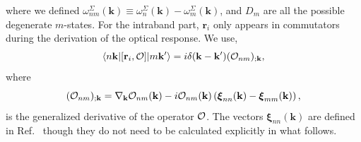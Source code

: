 \documentclass[floatfix,prb,aps,superscriptaddress,showpacs,11pt,preprint,letterpaper]{revtex4}
\begin{document}
where we defined
$\omega^\Sigma_{nm}(\mathbf{k})\equiv\omega^\Sigma_n(\mathbf{k})-\omega^\Sigma_m(\mathbf{k})$, and
$D_m$ are all the possible degenerate $m$-states. 
For the intraband part, $\mathbf{r}_i$ only appears in
commutators during the derivation of
the optical response. We use,\cite{aversaPRB95}
\begin{equation}
\langle n\mathbf{k} | [\mathbf{r}_i,{\cal O}] | m\mathbf{k}'\rangle
=i\delta(\mathbf{k}-\mathbf{k}')({\cal O}_{nm})_{;\mathbf{k}},
\label{conmri3n}
\end{equation}  
where
\begin{equation}
({\cal O}_{nm})_{;\mathbf{k}}=
\nabla_\mathbf{k} 
{\cal O}_{n m}(\mathbf{k}) 
- 
i 
{\cal O}_{nm}(\mathbf{k}) 
\left(
\boldsymbol{\xi}_{nn}(\mathbf{k}) 
-
\boldsymbol{\xi}_{mm}(\mathbf{k}) 
\right) 
,
\label{gendevnn}
\end{equation} 
is
the generalized derivative 
of the operator ${\cal O}$. 
The vectors $\boldsymbol{\xi}_{nn}(\mathbf{k})$ are defined in 
Ref.~ though they do not need to be 
calculated explicitly in what follows. 
\end{document}
